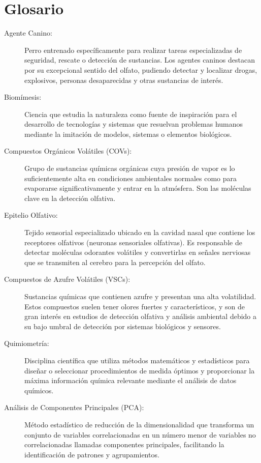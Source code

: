 \documentclass[hidelinks, headlogo, framedcover]{tfeEPCC}
\begin{document}
\chapter*{Glosario}
\begin{description}
    \item[Agente Canino:] Perro entrenado específicamente para realizar tareas especializadas de seguridad, rescate o detección de sustancias. Los agentes caninos destacan por su excepcional sentido del olfato, pudiendo detectar y localizar drogas, explosivos, personas desaparecidas y otras sustancias de interés.
    
    \item[Biomímesis:] Ciencia que estudia la naturaleza como fuente de inspiración para el desarrollo de tecnologías y sistemas que resuelvan problemas humanos mediante la imitación de modelos, sistemas o elementos biológicos.
    
    \item[Compuestos Orgánicos Volátiles (COVs):] Grupo de sustancias químicas orgánicas cuya presión de vapor es lo suficientemente alta en condiciones ambientales normales como para evaporarse significativamente y entrar en la atmósfera. Son las moléculas clave en la detección olfativa.
    
    \item[Epitelio Olfativo:] Tejido sensorial especializado ubicado en la cavidad nasal que contiene los receptores olfativos (neuronas sensoriales olfativas). Es responsable de detectar moléculas odorantes volátiles y convertirlas en señales nerviosas que se transmiten al cerebro para la percepción del olfato.
    
    \item[Compuestos de Azufre Volátiles (VSCs):] Sustancias químicas que contienen azufre y presentan una alta volatilidad. Estos compuestos suelen tener olores fuertes y característicos, y son de gran interés en estudios de detección olfativa y análisis ambiental debido a su bajo umbral de detección por sistemas biológicos y sensores.
    
    \item[Quimiometría:] Disciplina científica que utiliza métodos matemáticos y estadísticos para diseñar o seleccionar procedimientos de medida óptimos y proporcionar la máxima información química relevante mediante el análisis de datos químicos.
    
    \item[Análisis de Componentes Principales (PCA):] Método estadístico de reducción de la dimensionalidad que transforma un conjunto de variables correlacionadas en un número menor de variables no correlacionadas llamadas componentes principales, facilitando la identificación de patrones y agrupamientos.
    

\end{description}
\end{document}
